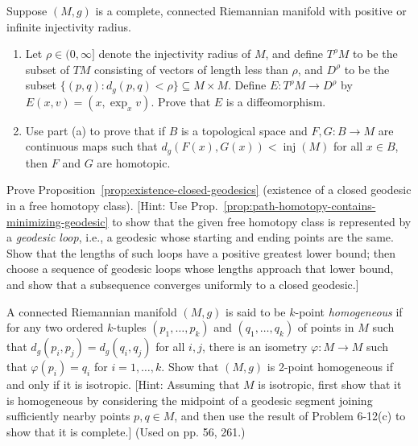 \begin{exercise}
\label{prob:inj-radius-diffeomorphism}

Suppose $(M, g)$ is a complete, connected Riemannian manifold with positive or infinite injectivity radius.
\begin{enumerate}
\item[(a)] Let $\rho \in (0, \infty]$ denote the injectivity radius of $M$, and define $T^\rho M$ to be the subset of $TM$ consisting of vectors of length less than $\rho$, and $D^\rho$ to be the subset $\{(p, q) : d_g(p, q) < \rho\} \subseteq M \times M$. Define $E : T^\rho M \to D^\rho$ by $E(x, v) = (x, \exp_x v)$. Prove that $E$ is a diffeomorphism.
\item[(b)] Use part (a) to prove that if $B$ is a topological space and $F, G : B \to M$ are continuous maps such that $d_g(F(x), G(x)) < \operatorname{inj}(M)$ for all $x \in B$, then $F$ and $G$ are homotopic.
\end{enumerate}
\end{exercise}

\begin{exercise}
\label{prob:closed-geodesic-free-homotopy}

Prove Proposition~\ref{prop:existence-closed-geodesics} (existence of a closed geodesic in a free homotopy class). [Hint: Use Prop.~\ref{prop:path-homotopy-contains-minimizing-geodesic} to show that the given free homotopy class is represented by a \emph{geodesic loop}, i.e., a geodesic whose starting and ending points are the same. Show that the lengths of such loops have a positive greatest lower bound; then choose a sequence of geodesic loops whose lengths approach that lower bound, and show that a subsequence converges uniformly to a closed geodesic.]
\end{exercise}

\begin{exercise}
\label{prob:k-point-homogeneous}

A connected Riemannian manifold $(M,g)$ is said to be $k$-point \emph{homogeneous} if for any two ordered $k$-tuples $(p_1,\ldots,p_k)$ and $(q_1,\ldots,q_k)$ of points in $M$ such that $d_g(p_i, p_j) = d_g(q_i,q_j)$ for all $i,j$, there is an isometry $\varphi: M \to M$ such that $\varphi(p_i) = q_i$ for $i = 1,\ldots,k$. Show that $(M,g)$ is 2-point homogeneous if and only if it is isotropic. [Hint: Assuming that $M$ is isotropic, first show that it is homogeneous by considering the midpoint of a geodesic segment joining sufficiently nearby points $p, q \in M$, and then use the result of Problem 6-12(c) to show that it is complete.] (Used on pp. 56, 261.)
\end{exercise}

